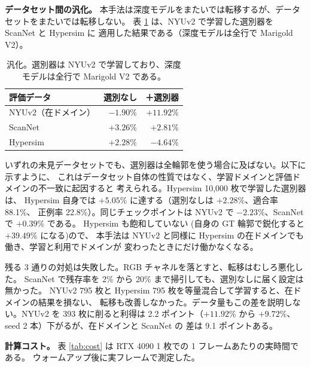 \documentclass[conference]{IEEEtran}
\begin{document}
\textbf{データセット間の汎化。}\label{sec:transfer} 本手法は深度モデルをまたいでは転移するが、データセットをまたいでは転移しない。
表 \ref{tab:generalisation} は、NYUv2 で学習した選別器を ScanNet と Hypersim に
適用した結果である（深度モデルは全行で Marigold V2）。

\begin{table}[t]
\caption{汎化。選別器は \textnormal{NYUv2} で学習しており、深度モデルは全行で Marigold V2 である。}
\label{tab:generalisation}
\centering
\begin{tabular}{lrr}
\toprule
評価データ & 選別なし & ＋選別器 \\
\midrule
NYUv2（在ドメイン） & $-1.90\%$ & $\mathbf{+11.92\%}$ \\
ScanNet & $+3.26\%$ & $+2.81\%$ \\
Hypersim & $+2.28\%$ & $-4.64\%$ \\
\bottomrule
\end{tabular}
\end{table}

いずれの未見データセットでも、選別器は全輪郭を使う場合に及ばない。以下に示すように、
これはデータセット自体の性質ではなく、学習ドメインと評価ドメインの不一致に起因すると
考えられる。Hypersim 10{,}000 枚で学習した選別器は、
Hypersim 自身では $+5.05\%$ に達する（選別なしは $+2.28\%$、適合率 88.1\%、
正例率 22.8\%）。同じチェックポイントは NYUv2 で $-2.23\%$、ScanNet で $+0.39\%$ である。
Hypersim も飽和していない (自身の GT 輪郭で鋭化すると $+39.49\%$ になる)ので、
本手法は NYUv2 と同様に Hypersim の在ドメインでも働き、学習と利用でドメインが
変わったときにだけ働かなくなる。

残る 3 通りの対処は失敗した。RGB チャネルを落とすと、転移はむしろ悪化した。
ScanNet で残存率を 2\% から 20\% まで掃引しても、選別なしに届く設定は無かった。
NYUv2 795 枚と Hypersim 795 枚を等量混合して学習すると、在ドメインの結果を損ない、
転移も改善しなかった。データ量もこの差を説明しない。NYUv2 を 393 枚に削ると利得は
2.2 ポイント（$+11.92\%$ から $+9.72\%$、seed 2 本）下がるが、在ドメインと ScanNet の
差は 9.1 ポイントある。

\textbf{計算コスト。}\label{sec:cost} 表 \ref{tab:cost} は RTX 4090 1 枚での 1 フレームあたりの実時間である。
ウォームアップ後に実フレームで測定した。
\end{document}

